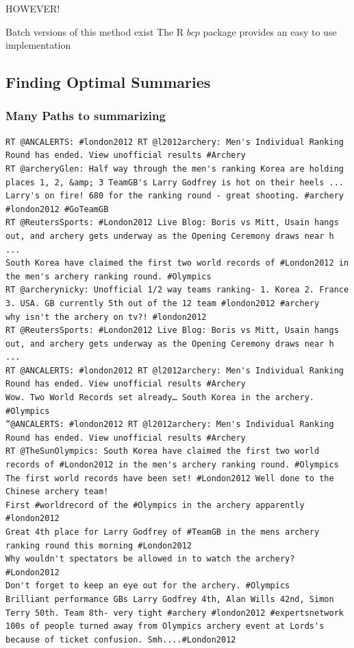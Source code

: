 \documentclass[compress]{beamer}
\begin{document}
\begin{frame}{HOWEVER!}
\begin{block}{Batch versions of this method exist}
The R $bcp$ package provides an easy to use implementation
\end{block}


\end{frame}

\subsection{Finding Optimal Summaries}

\begin{frame}[fragile]
\frametitle{Many Paths to summarizing}

{\fontsize{1}{0}\selectfont
\begin{verbatim}
RT @ANCALERTS: #london2012 RT @l2012archery: Men's Individual Ranking Round has ended. View unofficial results #Archery
RT @archeryGlen: Half way through the men's ranking Korea are holding places 1, 2, &amp; 3 TeamGB's Larry Godfrey is hot on their heels ...
Larry's on fire! 680 for the ranking round - great shooting. #archery #london2012 #GoTeamGB
RT @ReutersSports: #London2012 Live Blog: Boris vs Mitt, Usain hangs out, and archery gets underway as the Opening Ceremony draws near h ...
South Korea have claimed the first two world records of #London2012 in the men's archery ranking round. #Olympics
RT @archerynicky: Unofficial 1/2 way teams ranking- 1. Korea 2. France 3. USA. GB currently 5th out of the 12 team #london2012 #archery
why isn't the archery on tv?! #london2012
RT @ReutersSports: #London2012 Live Blog: Boris vs Mitt, Usain hangs out, and archery gets underway as the Opening Ceremony draws near h ...
RT @ANCALERTS: #london2012 RT @l2012archery: Men's Individual Ranking Round has ended. View unofficial results #Archery
Wow. Two World Records set already… South Korea in the archery. #Olympics
“@ANCALERTS: #london2012 RT @l2012archery: Men's Individual Ranking Round has ended. View unofficial results #Archery
RT @TheSunOlympics: South Korea have claimed the first two world records of #London2012 in the men's archery ranking round. #Olympics
The first world records have been set! #London2012 Well done to the Chinese archery team!
First #worldrecord of the #Olympics in the archery apparently #london2012
Great 4th place for Larry Godfrey of #TeamGB in the mens archery ranking round this morning #London2012
Why wouldn't spectators be allowed in to watch the archery? #London2012
Don't forget to keep an eye out for the archery. #Olympics
Brilliant performance GBs Larry Godfrey 4th, Alan Wills 42nd, Simon Terry 50th. Team 8th- very tight #archery #london2012 #expertsnetwork
100s of people turned away from Olympics archery event at Lords's because of ticket confusion. Smh....#London2012
\end{verbatim}
}


\end{frame}
\end{document}
